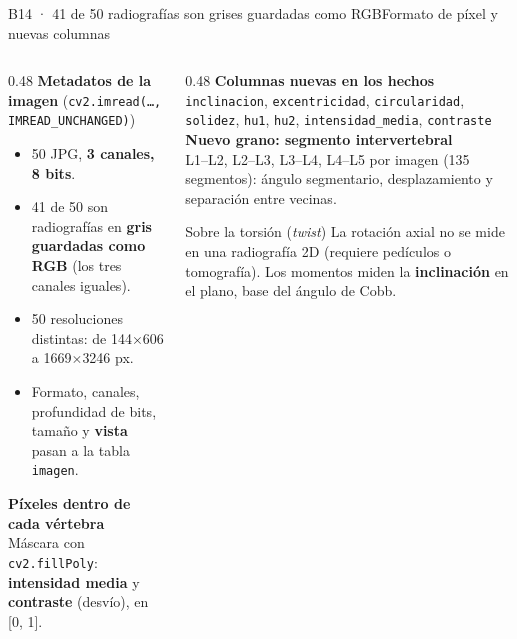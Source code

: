 \documentclass[aspectratio=169,10pt]{beamer}
\begin{document}
\begin{frame}{B14 · 41 de 50 radiografías son grises guardadas como RGB}{Formato de píxel y nuevas columnas}
  \begin{columns}[T]
    \begin{column}{0.48\textwidth}
      \textbf{\color{itba}Metadatos de la imagen} (\texttt{cv2.imread(…, IMREAD\_UNCHANGED)})\\[0.6ex]
      \small
      \begin{itemize}\setlength{\itemsep}{0.4ex}
        \item 50 JPG, \textbf{3 canales, 8 bits}.
        \item 41 de 50 son radiografías en \textbf{gris guardadas como RGB} (los tres canales iguales).
        \item 50 resoluciones distintas: de 144$\times$606 a 1669$\times$3246 px.
        \item Formato, canales, profundidad de bits, tamaño y \textbf{vista} pasan a la tabla \texttt{imagen}.
      \end{itemize}
      \vspace{0.6ex}
      \textbf{\color{itba}Píxeles dentro de cada vértebra}\\[0.4ex]
      Máscara con \texttt{cv2.fillPoly}: \textbf{intensidad media} y \textbf{contraste} (desvío), en [0, 1].
    \end{column}
    \begin{column}{0.48\textwidth}
      \textbf{\color{itba}Columnas nuevas en los hechos}\\[0.6ex]
      \small
      \texttt{inclinacion}, \texttt{excentricidad}, \texttt{circularidad}, \texttt{solidez}, \texttt{hu1}, \texttt{hu2}, \texttt{intensidad\_media}, \texttt{contraste}\\[1ex]
      \textbf{\color{itba}Nuevo grano: segmento intervertebral}\\[0.6ex]
      L1–L2, L2–L3, L3–L4, L4–L5 por imagen (135 segmentos): ángulo segmentario, desplazamiento y separación entre vecinas.\\[1ex]
      \begin{block}{Sobre la torsión (\emph{twist})}
        \footnotesize La rotación axial no se mide en una radiografía 2D (requiere pedículos o tomografía). Los momentos miden la \textbf{inclinación} en el plano, base del ángulo de Cobb.
      \end{block}
    \end{column}
  \end{columns}
\end{frame}
\end{document}
